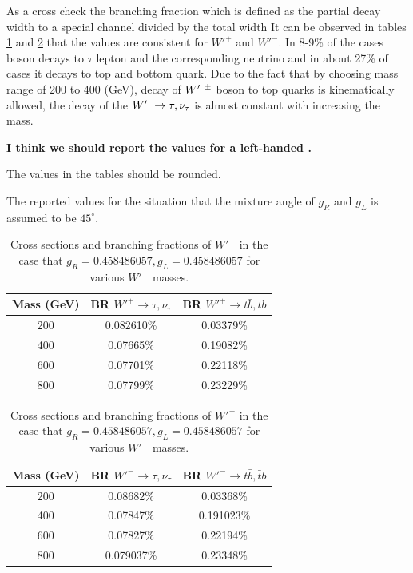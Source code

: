 As a cross check the branching fraction which is defined as the partial decay width to a special channel divided by the total width
It can be observed in tables \ref{tab:W'Plus} and \ref{tab:W'Minus} that the values are consistent for $W'^+$ and $W'^-$. In 8-9\% of the cases \wprime boson decays to $\tau$ lepton and the corresponding neutrino and in about 27\% of cases it decays to top and  bottom quark. Due to the fact that by choosing mass range of 200 to 400 (GeV), decay of $ W^\prime~^\pm $ boson to top quarks is kinematically allowed, the decay of the $ W^\prime~\rightarrow \tau,\nu_\tau $ is almost constant with increasing the \wprime mass.
{\bf I think we should report the values for a left-handed \wprime.
	
	The values in the tables should be rounded.
	
	The reported values for the situation that the mixture angle of $ g_R$ and  $g_L$ is assumed to be $45^\circ $. }
\begin{table}[htb]
	\centering
	\begin{tabular}{|c|c|c|}
		\hline 
		\wprime Mass (GeV)  &  BR $ W'^+\rightarrow \tau,\nu_\tau $& BR $ W'^+\rightarrow  t \bar{b},\bar{t}b $ \\
		\hline 
		200 & 0.082610\% & 0.03379\%\\
		400 &0.07665\%& 0.19082\%\\
		600 &0.07701\%&0.22118\%\\
		800&0.07799\% &0.23229\%\\
		\hline
	\end{tabular}
	\caption{Cross sections and branching fractions of $W'^+$ in the case that $ g_R=0.458486057 , g_L=0.458486057  $ for various $W'^+$ masses. \label{tab:W'Plus} }
\end{table}

\begin{table}[htb]
	\centering
	\begin{tabular}{|c|c|c|}
		\hline 
		\wprime Mass (GeV)  &  BR $ W'^-\rightarrow \tau,\nu_\tau $ & BR $ W'^-\rightarrow  t \bar{b},\bar{t}b $ \\
		\hline 
		200 &  0.08682\% &0.03368\% \\
		400  &0.07847\% &0.191023\% \\
		600  &0.07827\%&0.22194\%\\
		800  &0.079037\% &0.23348\% \\
		\hline
	\end{tabular}
	\caption{Cross sections and branching fractions of $W'^-$ in the case that $ g_R=0.458486057 , g_L=0.458486057  $ for various $W'^-$ masses. \label{tab:W'Minus} }
\end{table}


